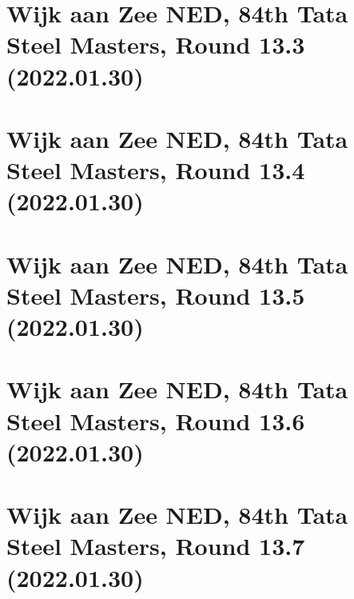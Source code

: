 \documentclass[11pt]{article}
\newcommand*\cleartoleftpage{%
   \clearpage
   \ifodd\value{page}\hbox{}\newpage\fi
}
\begin{document}
\cleartoleftpage

\section{Wijk aan Zee NED, 84th Tata Steel Masters, Round 13.3 (2022.01.30)}


\cleartoleftpage

\section{Wijk aan Zee NED, 84th Tata Steel Masters, Round 13.4 (2022.01.30)}


\cleartoleftpage

\section{Wijk aan Zee NED, 84th Tata Steel Masters, Round 13.5 (2022.01.30)}


\cleartoleftpage

\section{Wijk aan Zee NED, 84th Tata Steel Masters, Round 13.6 (2022.01.30)}


\cleartoleftpage

\section{Wijk aan Zee NED, 84th Tata Steel Masters, Round 13.7 (2022.01.30)}


\cleartoleftpage
\end{document}
